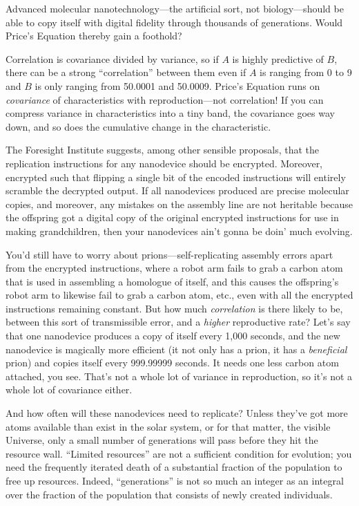 {{
 Advanced molecular nanotechnology---the artificial sort, not
biology---should be able to copy itself with digital fidelity through
thousands of generations. Would Price's Equation
thereby gain a foothold?}

{
 Correlation is covariance divided by variance, so if $A$ is highly
predictive of $B$, there can be a strong
``correlation'' between them even if
$A$ is ranging from 0 to 9 and $B$ is only ranging from 50.0001 and
50.0009. Price's Equation runs on \textit{covariance}
of characteristics with reproduction---not correlation! If you can
compress variance in characteristics into a tiny band, the covariance
goes way down, and so does the cumulative change in the
characteristic.}

{
 The Foresight Institute suggests, among other sensible proposals,
that the replication instructions for any nanodevice should be
encrypted. Moreover, encrypted such that flipping a single bit of the
encoded instructions will entirely scramble the decrypted output. If
all nanodevices produced are precise molecular copies, and moreover,
any mistakes on the assembly line are not heritable because the
offspring got a digital copy of the original encrypted instructions for
use in making grandchildren, then your nanodevices
ain't gonna be doin' much evolving.}

{
 You'd still have to worry about
prions---self-replicating assembly errors apart from the encrypted
instructions, where a robot arm fails to grab a carbon atom that is
used in assembling a homologue of itself, and this causes the
offspring's robot arm to likewise fail to grab a carbon
atom, etc., even with all the encrypted instructions remaining
constant. But how much \textit{correlation} is there likely to be,
between this sort of transmissible error, and a \textit{higher}
reproductive rate? Let's say that one nanodevice
produces a copy of itself every 1,000 seconds, and the new nanodevice
is magically more efficient (it not only has a prion, it has a
\textit{beneficial} prion) and copies itself every 999.99999 seconds.
It needs one less carbon atom attached, you see. That's
not a whole lot of variance in reproduction, so it's
not a whole lot of covariance either.}

{
 And how often will these nanodevices need to replicate? Unless
they've got more atoms available than exist in the
solar system, or for that matter, the visible Universe, only a small
number of generations will pass before they hit the resource wall.
``Limited resources'' are not a
sufficient condition for evolution; you need the frequently iterated
death of a substantial fraction of the population to free up resources.
Indeed, ``generations'' is not so
much an integer as an integral over the fraction of the population that
consists of newly created individuals.}

}
